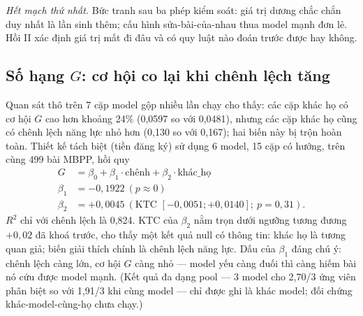 \emph{Hết mạch thứ nhất.} Bức tranh sau ba phép kiểm soát: giá trị dương chắc chắn duy nhất là lần sinh thêm; cấu hình sửa-bài-của-nhau thua model mạnh đơn lẻ. Hồi II xác định giá trị mất đi đâu và có quy luật nào đoán trước được hay không.

\subsection{Số hạng $G$: cơ hội co lại khi chênh lệch tăng}\label{sec:termG}

Quan sát thô trên 7 cặp model gộp nhiều lần chạy cho thấy: các cặp khác họ có cơ hội $G$ cao hơn khoảng 24\% (0,0597 so với 0,0481), nhưng các cặp khác họ cũng có chênh lệch năng lực nhỏ hơn (0,130 so với 0,167); hai biến này bị trộn hoàn toàn. Thiết kế tách biệt (tiền đăng ký) sử dụng 6 model, 15 cặp có hướng, trên cùng 499 bài MBPP, hồi quy
\begin{align*}
G &= \beta_0 + \beta_1\cdot\text{chênh} + \beta_2\cdot\text{khác\_họ}\\
\beta_1 &= -0{,}1922\ (p \approx 0)\\
\beta_2 &= +0{,}0045\ (\text{KTC } [-0{,}0051;+0{,}0140];\ p = 0{,}31).
\end{align*}
$R^2$ chỉ với chênh lệch là 0,824. KTC của $\beta_2$ nằm trọn dưới ngưỡng tương đương $+0{,}02$ đã khoá trước, cho thấy một kết quả null có thông tin: khác họ là tương quan giả; biến giải thích chính là chênh lệch năng lực. Dấu của $\beta_1$ đáng chú ý: chênh lệch càng lớn, cơ hội $G$ càng nhỏ --- model yếu càng đuối thì càng hiếm bài nó cứu được model mạnh. (Kết quả đa dạng pool --- 3 model cho 2,70/3 ứng viên phân biệt so với 1,91/3 khi cùng model --- chỉ được ghi là khác model; đối chứng khác-model-cùng-họ chưa chạy.)

